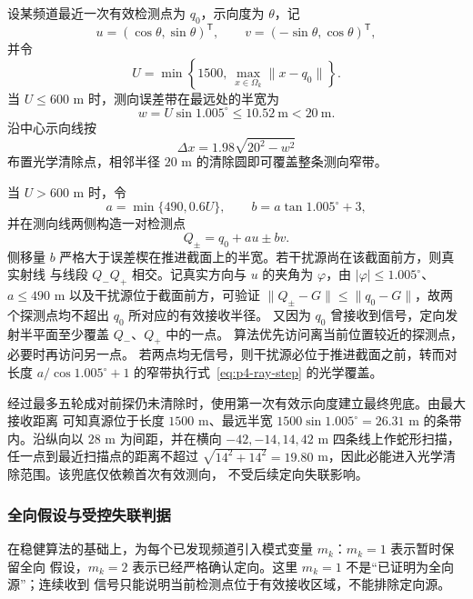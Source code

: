 设某频道最近一次有效检测点为 $q_0$，示向度为 $\theta$，记
\begin{equation}
u=(\cos\theta,\sin\theta)^{\mathsf T},\qquad
v=(-\sin\theta,\cos\theta)^{\mathsf T},
\end{equation}
并令
\begin{equation}
U=\min\left\{1500,\ \max_{x\in\Omega_k}\|x-q_0\|\right\}.
\end{equation}
当 $U\le600$ m 时，测向误差带在最远处的半宽为
\begin{equation}
w=U\sin1.005^\circ\le10.52\ \mathrm m<20\ \mathrm m.
\end{equation}
沿中心示向线按
\begin{equation}
\Delta x=1.98\sqrt{20^2-w^2}
\label{eq:p4-ray-step}
\end{equation}
布置光学清除点，相邻半径 $20$ m 的清除圆即可覆盖整条测向窄带。

当 $U>600$ m 时，令
\begin{equation}
a=\min\{490,0.6U\},\qquad b=a\tan1.005^\circ+3,
\end{equation}
并在测向线两侧构造一对检测点
\begin{equation}
Q_\pm=q_0+au\pm bv.
\label{eq:p4-paired-probes}
\end{equation}
侧移量 $b$ 严格大于误差楔在推进截面上的半宽。若干扰源尚在该截面前方，则真实射线
与线段 $Q_-Q_+$ 相交。记真实方向与 $u$ 的夹角为 $\varphi$，由
$|\varphi|\le1.005^\circ$、$a\le490$ m 以及干扰源位于截面前方，可验证
$\|Q_\pm-G\|\le\|q_0-G\|$，故两个探测点均不超出 $q_0$ 所对应的有效接收半径。
又因为 $q_0$ 曾接收到信号，定向发射半平面至少覆盖 $Q_-$、$Q_+$ 中的一点。
算法优先访问离当前位置较近的探测点，必要时再访问另一点。
若两点均无信号，则干扰源必位于推进截面之前，转而对长度
$a/\cos1.005^\circ+1$ 的窄带执行式~\eqref{eq:p4-ray-step} 的光学覆盖。

经过最多五轮成对前探仍未清除时，使用第一次有效示向度建立最终兜底。由最大接收距离
可知真源位于长度 $1500$ m、最远半宽
$1500\sin1.005^\circ=26.31$ m 的条带内。沿纵向以 $28$ m 为间距，并在横向
$-42,-14,14,42$ m 四条线上作蛇形扫描，任一点到最近扫描点的距离不超过
$\sqrt{14^2+14^2}=19.80$ m，因此必能进入光学清除范围。该兜底仅依赖首次有效测向，
不受后续定向失联影响。

\subsubsection{全向假设与受控失联判据}

在稳健算法的基础上，为每个已发现频道引入模式变量 $m_k$：$m_k=1$ 表示暂时保留全向
假设，$m_k=2$ 表示已经严格确认定向。这里 $m_k=1$ 不是“已证明为全向源”；连续收到
信号只能说明当前检测点位于有效接收区域，不能排除定向源。

